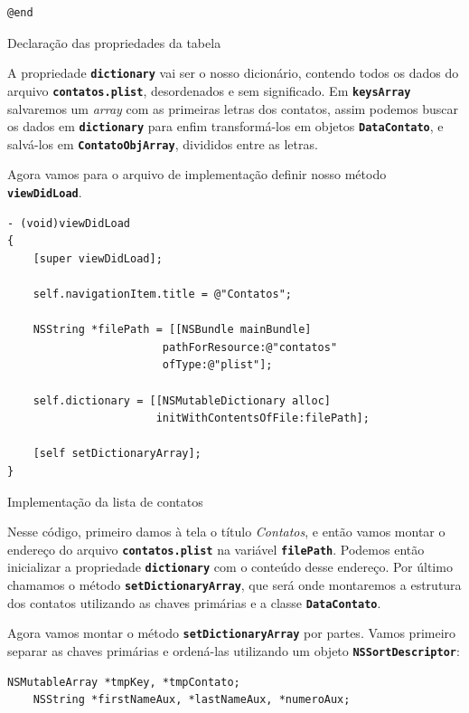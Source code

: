 \documentclass[a4paper,12pt,brazil,doubleside]{book}
\begin{document}
\begin{singlespace}
\begin{listing}[H]
\begin{verbatim}
@end
\end{verbatim}
\caption{Declaração das propriedades da tabela}
\end{listing}


A propriedade \texttt{\textbf{dictionary}} vai ser o nosso dicionário, contendo todos os dados do arquivo \texttt{\textbf{contatos.plist}}, desordenados e sem significado. Em \texttt{\textbf{keysArray}} salvaremos um \emph{array} com as primeiras letras dos contatos, assim podemos buscar os dados em \texttt{\textbf{dictionary}} para enfim transformá-los em objetos \texttt{\textbf{DataContato}}, e salvá-los em \texttt{\textbf{ContatoObjArray}}, divididos entre as letras.

Agora vamos para o arquivo de implementação definir nosso método \texttt{\textbf{viewDidLoad}}.

\begin{listing}[H]
\begin{verbatim}
- (void)viewDidLoad
{
    [super viewDidLoad];
    
    self.navigationItem.title = @"Contatos";
    
    NSString *filePath = [[NSBundle mainBundle]
    					pathForResource:@"contatos"
    					ofType:@"plist"];
    
    self.dictionary = [[NSMutableDictionary alloc]
    				   initWithContentsOfFile:filePath];
    
    [self setDictionaryArray];
}
\end{verbatim}
\caption{Implementação da lista de contatos}
\end{listing}


Nesse código, primeiro damos à tela o título \emph{Contatos}, e então vamos montar o endereço do arquivo \texttt{\textbf{contatos.plist}} na variável \texttt{\textbf{filePath}}. Podemos então inicializar a propriedade \texttt{\textbf{dictionary}} com o conteúdo desse endereço. Por último chamamos o método \texttt{\textbf{setDictionaryArray}}, que será onde montaremos a estrutura dos contatos utilizando as chaves primárias e a classe \texttt{\textbf{DataContato}}.

Agora vamos montar o método \texttt{\textbf{setDictionaryArray}} por partes. Vamos primeiro separar as chaves primárias e ordená-las utilizando um objeto \texttt{\textbf{NSSortDescriptor}}:

\begin{listing}[H]
\begin{verbatim}
NSMutableArray *tmpKey, *tmpContato;
    NSString *firstNameAux, *lastNameAux, *numeroAux;
    

\end{verbatim}
\end{listing}
\end{singlespace}
\end{document}
